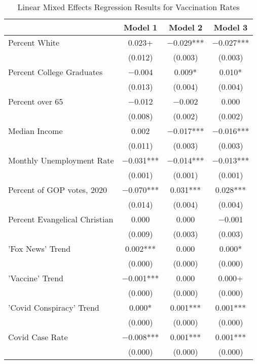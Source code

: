 \begin{table}[!ht]

\caption{\label{tab:vacc-tab}Linear Mixed Effects Regression Results for Vaccination Rates}
\centering
\fontsize{8}{10}\selectfont
\begin{tabular}{lccc}
\toprule
  & Model 1 & Model 2 & Model 3\\
\midrule
Percent White & \num{0.023}+ & \num{-0.029}*** & \num{-0.027}***\\
 & (\num{0.012}) & (\num{0.003}) & (\num{0.003})\\
Percent College Graduates & \num{-0.004} & \num{0.009}* & \num{0.010}*\\
 & (\num{0.013}) & (\num{0.004}) & (\num{0.004})\\
Percent over 65 & \num{-0.012} & \num{-0.002} & \num{0.000}\\
 & (\num{0.008}) & (\num{0.002}) & (\num{0.002})\\
Median Income & \num{0.002} & \num{-0.017}*** & \num{-0.016}***\\
 & (\num{0.011}) & (\num{0.003}) & (\num{0.003})\\
Monthly Unemployment Rate & \num{-0.031}*** & \num{-0.014}*** & \num{-0.013}***\\
 & (\num{0.001}) & (\num{0.001}) & (\num{0.001})\\
Percent of GOP votes, 2020 & \num{-0.070}*** & \num{0.031}*** & \num{0.028}***\\
 & (\num{0.014}) & (\num{0.004}) & (\num{0.004})\\
Percent Evangelical Christian & \num{0.000} & \num{0.000} & \num{-0.001}\\
 & (\num{0.009}) & (\num{0.003}) & (\num{0.003})\\
'Fox News' Trend & \num{0.002}*** & \num{0.000} & \num{0.000}*\\
 & (\num{0.000}) & (\num{0.000}) & \vphantom{4} (\num{0.000})\\
'Vaccine' Trend & \num{-0.001}*** & \num{0.000} & \num{0.000}+\\
 & (\num{0.000}) & (\num{0.000}) & \vphantom{3} (\num{0.000})\\
'Covid Conspiracy' Trend & \num{0.000}* & \num{0.001}*** & \num{0.001}***\\
 & (\num{0.000}) & (\num{0.000}) & \vphantom{2} (\num{0.000})\\
Covid Case Rate & \num{-0.008}*** & \num{0.001}*** & \num{0.001}***\\
 & (\num{0.000}) & (\num{0.000}) & \vphantom{1} (\num{0.000})\\

\end{tabular}
\end{table}
